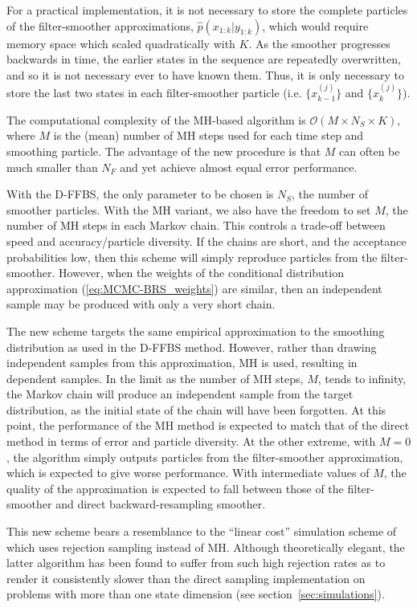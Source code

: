 \documentclass[peerreview,11pt,draftcls,onecolumn]{IEEEtran}
\begin{document}
For a practical implementation, it is not necessary to store the complete particles of the filter-smoother approximations, $\hat{p}(x_{1:k}|y_{1:k})$, which would require memory space which scaled quadratically with $K$. As the smoother progresses backwards in time, the earlier states in the sequence are repeatedly overwritten, and so it is not necessary ever to have known them. Thus, it is only necessary to store the last two states in each filter-smoother particle (i.e. $\{x_{k-1}^{(j)}\}$ and $\{x_{k}^{(j)}\}$).

The computational complexity of the MH-based algorithm is $\mathcal{O}(M \times N_S \times K)$, where $M$ is the (mean) number of MH steps used for each time step and smoothing particle. The advantage of the new procedure is that $M$ can often be much smaller than $N_F$ and yet achieve almost equal error performance.

With the D-FFBS, the only parameter to be chosen is $N_S$, the number of smoother particles. With the MH variant, we also have the freedom to set $M$, the number of MH steps in each Markov chain. This controls a trade-off between speed and accuracy/particle diversity. If the chains are short, and the acceptance probabilities low, then this scheme will simply reproduce particles from the filter-smoother. However, when the weights of the conditional distribution approximation (\ref{eq:MCMC-BRS_weights}) are similar, then an independent sample may be produced with only a very short chain.

The new scheme targets the same empirical approximation to the smoothing distribution as used in the D-FFBS method. However, rather than drawing independent samples from this approximation, MH is used, resulting in dependent samples.  In the limit as the number of MH steps, $M$, tends to infinity, the Markov chain will produce an independent sample from the target distribution, as the initial state of the chain will have been forgotten. At this point, the performance of the MH method is expected to match that of the direct method in terms of error and particle diversity. At the other extreme, with $M=0$, the algorithm simply outputs particles from the filter-smoother approximation, which is expected to give worse performance. With intermediate values of $M$, the quality of the approximation is expected to fall between those of the filter-smoother and direct backward-resampling smoother.

This new scheme bears a resemblance to the ``linear cost'' simulation scheme of \cite{Douc2009} which uses rejection sampling instead of MH. Although theoretically elegant, the latter algorithm has been found to suffer from such high rejection rates as to render it consistently slower than the direct sampling implementation on problems with more than one state dimension (see section~\ref{sec:simulations}).
\end{document}
